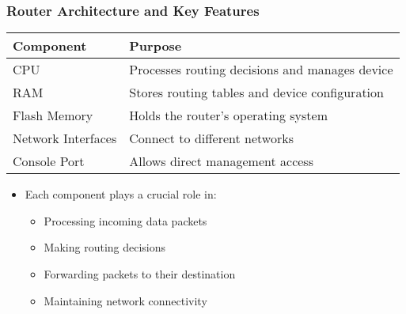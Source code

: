 \documentclass{beamer}
\begin{document}
\begin{frame}
    \frametitle{Router Architecture and Key Features}
    
    \begin{tabular}{|p{}|p{}|}
        \hline
        \textbf{Component} & \textbf{Purpose} \\
        \hline
        CPU & Processes routing decisions and manages device \\
        \hline
        RAM & Stores routing tables and device configuration \\
        \hline
        Flash Memory & Holds the router's operating system \\
        \hline
        Network Interfaces & Connect to different networks \\
        \hline
        Console Port & Allows direct management access \\
        \hline
    \end{tabular}
    
    \begin{itemize}
        \item Each component plays a crucial role in:
        \begin{itemize}
            \item Processing incoming data packets
            \item Making routing decisions
            \item Forwarding packets to their destination
            \item Maintaining network connectivity
        \end{itemize}
    \end{itemize}
\end{frame}
\end{document}
